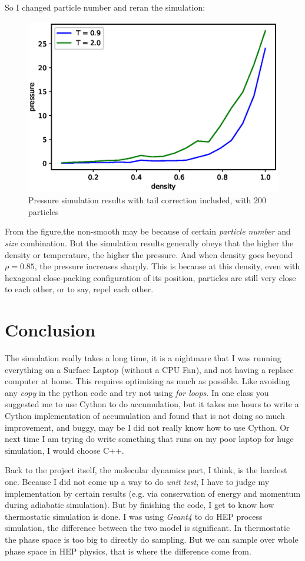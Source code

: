 \documentclass[UTF8,a4paper]{article}
\begin{document}
So I changed particle number and reran the simulation:
\begin{figure}[H]
	\centering
	\includegraphics[height=0.2\textheight]{fig/pressure_200.eps}
	\caption{Pressure simulation results with tail correction included, with 200 particles}
	\label{fig:pressure-1}
\end{figure}

From the figure,the non-smooth may be because of certain \textit{particle number} and \textit{size} combination. But the simulation results generally obeys that the higher the density or temperature, the higher the pressure.
And when density goes beyond $\rho = 0.85$, the pressure increases sharply. This is because at this density, even with hexagonal close-packing configuration of its position, particles are still very close to
each other, or to say, repel each other.

\section{Conclusion}
The simulation really takes a long time, it is a nightmare that I was running everything on a Surface Laptop (without a CPU Fan), and not having a replace computer at home. This requires optimizing as much as possible. Like 
avoiding any \textit{copy} in the python code and try not using \textit{for loops}. In one class you suggested me to use Cython to do accumulation, but it takes me hours to write a Cython implementation of accumulation and found that 
is not doing so much improvement, and buggy, may be I did not really know how to use Cython. Or next time I am trying do write something that runs on my poor laptop for huge simulation, I would choose C++.

Back to the project itself, the molecular dynamics part, I think, is the hardest one. Because I did not come up a way to do \textit{unit test}, I have to judge my implementation by certain results (e.g. via conservation of energy and momentum during adiabatic simulation). 
But by finishing the code, I get to know how thermostatic simulation is done. I was using \textit{Geant4} to do HEP process simulation, the difference between the two model is significant. In thermostatic the phase space is too big to directly do 
sampling. But we can sample over whole phase space in HEP physics, that is where the difference come from.
\end{document}
